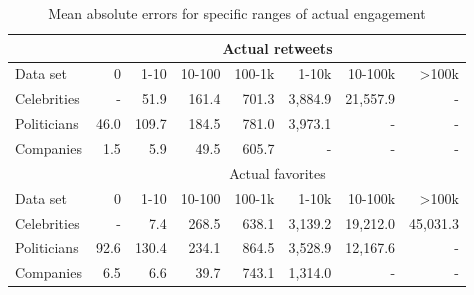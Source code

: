 \begin{table}
  \begin{tabular}{lrrrrrrr}
    \toprule
    & \multicolumn{7}{c}{Actual retweets} \\
    \midrule
    Data set & 0 & 1-10 & 10-100 & 100-1k & 1-10k & 10-100k & >100k \\
    \midrule
    Celebrities & - & 51.9 & 161.4 & 701.3 & 3,884.9 & 21,557.9 & - \\
    Politicians & 46.0 & 109.7 & 184.5 & 781.0 & 3,973.1 & - & - \\
    Companies & 1.5 & 5.9 & 49.5 & 605.7 & - & - & - \\
    \bottomrule
    \toprule
    & \multicolumn{7}{c}{Actual favorites} \\
    \midrule
    Data set & 0 & 1-10 & 10-100 & 100-1k & 1-10k & 10-100k & >100k \\
    \midrule
    Celebrities & - & 7.4 & 268.5 & 638.1 & 3,139.2 & 19,212.0 & 45,031.3 \\
    Politicians & 92.6 & 130.4 & 234.1 & 864.5 & 3,528.9 & 12,167.6 & - \\
    Companies & 6.5 & 6.6 & 39.7 & 743.1 & 1,314.0 & - & - \\
    \bottomrule
  \end{tabular}
  \caption{Mean absolute errors for specific ranges of actual engagement}
  \label{tab:d1_regression_eval}
\end{table}


